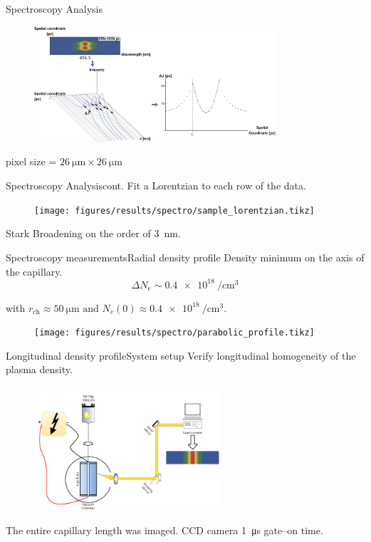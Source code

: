 \documentclass[dvipsnames]{beamer}
\begin{document}
\begin{frame}{Spectroscopy Analysis}
\begin{figure}
\includegraphics[width=0.8\textwidth]{figures/results/spectro/spectra_analysis.png}
 \end{figure}
 pixel size = $\SI{26}{\um} \times \SI{26}{\um}$
\end{frame}
\begin{frame}{Spectroscopy Analysis}{cont.}
Fit a Lorentzian to each row of the data.
\begin{figure}
  \texttt{[image: figures/results/spectro/sample\_lorentzian.tikz]}
\end{figure}
Stark Broadening on the order of \SI{3}{\nm}.
\end{frame}
\begin{frame}{Spectroscopy measurements}{Radial density profile}
 {\small Density minimum on the axis of the capillary.}
 \begin{equation*}
\Delta N_e \sim \SI{0.4e18}{\per \cubic \cm}
 \end{equation*}
\begin{center}
 with $r_\text{ch}\approx \SI{50}{\um} \text{ and } N_e\left(0\right)\approx \SI{0.4e18}{\per\cubic\cm}.$
\end{center}
\begin{figure}
\texttt{[image: figures/results/spectro/parabolic\_profile.tikz]}
\end{figure}
\end{frame}
\begin{frame}{Longitudinal density profile}{System setup}
 {\small Verify longitudinal homogeneity of the plasma density.}
 \begin{figure}
\includegraphics[height=130pt]{figures/results/spectro/longitudinal_system.png}
 \end{figure}
 The entire capillary length was imaged.
 CCD camera \SI{1}{\us} gate--on time.
\end{frame}
\end{document}
